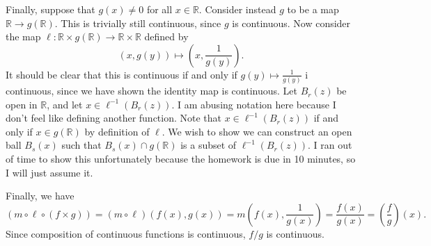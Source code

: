 \documentclass[11pt, letterpaper]{article}
\begin{document}
Finally, suppose that $g(x)\neq 0$ for all $x\in\mathbb{R} $. Consider instead $g$ to be a map $\mathbb{R} \to g(\mathbb{R} )$. This is trivially still continuous, since $g$ is continuous. Now consider the map $\ell : \mathbb{R} \times g(\mathbb{R} ) \to \mathbb{R} \times \mathbb{R} $ defined by
\[
	(x,g(y))\mapsto \left( x,\frac{1}{g(y)}  \right) 
.\]
It should be clear that this is continuous if and only if $g(y)\mapsto \frac{1}{g(y)} $ i continuous, since we have shown the identity map is continuous. Let $B_r(z)$ be open in $\mathbb{R} $, and let $x\in \ell ^{-1} (B_r(z))$. I am abusing notation here because I don't feel like defining another function. Note that $x\in \ell ^{-1} \left( B_r(z) \right) $ if and only if $x\in g(\mathbb{R} )$ by definition of $\ell $. We wish to show we can construct an open ball $B_s(x)$ such that $B_s(x)\cap g(\mathbb{R} )$ is a subset of $\ell ^{-1} (B_r(z))$. I ran out of time to show this unfortunately because the homework is due in 10 minutes, so I will just assume it.

Finally, we have
\[
	(m\circ \ell \circ (f\times g))=(m\circ \ell )(f(x),g(x))=m\left( f(x),\frac{1}{g(x)}  \right) =\frac{f(x)}{g(x)} =\left( \frac{f}{g}  \right) (x)
.\]
Since composition of continuous functions is continuous, $f/g$ is continuous.
\end{document}
